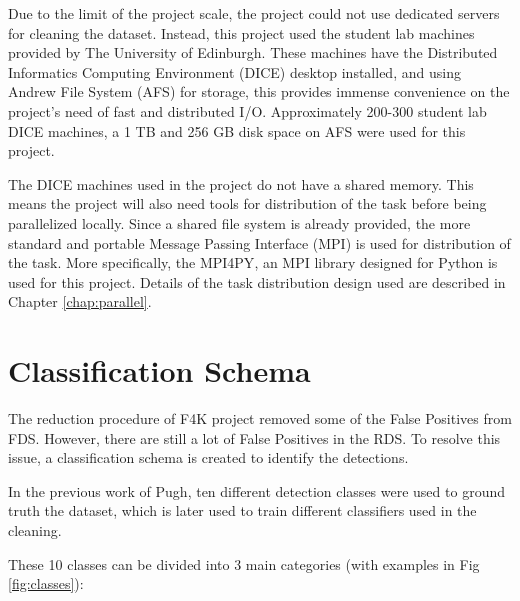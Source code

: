 \documentclass[bsc,frontabs,twoside,fullspacing,parskip,deptreport]{infthesis}
\begin{document}
Due to the limit of the project scale, the project could not use dedicated servers for cleaning the dataset.
Instead, this project used the student lab machines provided by The University of Edinburgh.
These machines have the Distributed Informatics Computing Environment (DICE) desktop installed, and using Andrew File System (AFS) for storage, this provides immense convenience on the project's need of fast and distributed I/O.
Approximately 200-300 student lab DICE machines, a 1 TB and 256 GB disk space on AFS were used for this project.

The DICE machines used in the project do not have a shared memory. 
This means the project will also need tools for distribution of the task before being parallelized locally.
Since a shared file system is already provided, the more standard and portable Message Passing Interface (MPI) is used for distribution of the task. 
More specifically, the MPI4PY\cite{MPI4PY}, an MPI library designed for Python is used for this project. Details of the task distribution design used are described in Chapter \ref{chap:parallel}.

\section{Classification Schema}
\label{sec:schema}

The reduction procedure of F4K project removed some of the False Positives from FDS. 
However, there are still a lot of False Positives in the RDS. 
To resolve this issue, a classification schema is created to identify the detections.

In the previous work of Pugh\cite{Pugh}, ten different detection classes were used to ground truth the dataset, which is later used to train different classifiers used in the cleaning. 

These 10 classes can be divided into 3 main categories (with examples in Fig \ref{fig:classes}):

\renewcommand{\labelenumi}{\bfseries\Roman{enumi}}
\renewcommand{\labelenumii}{\bfseries\arabic{enumii}}
\renewcommand{\labelenumiii}{\bfseries\roman{enumiii}}
\end{document}
